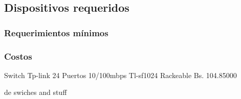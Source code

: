 \subsection{Dispositivos requeridos}\label{dispositivos-requeridos}

\subsubsection{Requerimientos mínimos}\label{requerimientos-muxednimos}

\subsubsection{Costos}\label{costos}

Switch Tp-link 24 Puertos 10/100mbps Tl-sf1024 Rackeable Bs. 104.85000

de swiches and stuff
